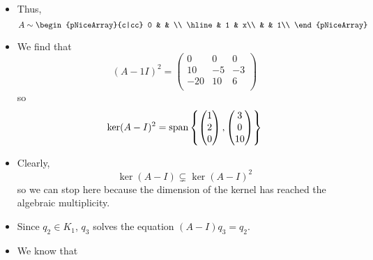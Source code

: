 \documentclass[../notes.tex]{subfiles}
\begin{document}
\begin{itemize}
\begin{itemize}
\begin{itemize}
        \end{itemize}
        \item Thus,
        \begin{equation*}
            A \sim
            \begin{pNiceArray}{c|cc}
                0 &  & \\
                \hline
                 & 1 & x\\
                 &  & 1\\
            \end{pNiceArray}
        \end{equation*}
        \item We find that
        \begin{equation*}
            (A-1I)^2 =
            \begin{pmatrix}
                0 & 0 & 0\\
                10 & -5 & -3\\
                -20 & 10 & 6\\
            \end{pmatrix}
        \end{equation*}
        so
        \begin{equation*}
            \ker(A-I)^2 = \operatorname{span}\left\{
                \begin{pmatrix}
                    1\\
                    2\\
                    0\\
                \end{pmatrix},
                \begin{pmatrix}
                    3\\
                    0\\
                    10\\
                \end{pmatrix}
            \right\}
        \end{equation*}
        \item Clearly,
        \begin{equation*}
            \ker(A-I) \subsetneq \ker(A-I)^2
        \end{equation*}
        so we can stop here because the dimension of the kernel has reached the algebraic multiplicity.
        \item Since $q_2\in K_1$, $q_3$ solves the equation $(A-I)q_3=q_2$.
        \item We know that
        \begin{align*}

\end{align*}
\end{itemize}
\end{itemize}
\end{document}
